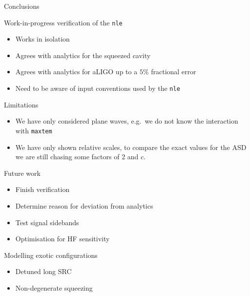 \documentclass[12pt]{beamer}
\newcommand{\code}[1]{\texttt{#1}}
\begin{document}
\begin{frame}{Conclusions}
\begin{block}{Work-in-progress verification of the \code{nle}}
\begin{itemize}
\item Works in isolation 
\item Agrees with analytics for the squeezed cavity
\item Agrees with analytics for aLIGO up to a $5\%$ fractional error
\item Need to be aware of input conventions used by the \code{nle}
\end{itemize}
\end{block}

\begin{alertblock}{Limitations}
\begin{itemize}
\item We have only considered plane waves, e.g.\ we do not know the interaction with \code{maxtem}
\item We have only shown relative scales, to compare the exact values for the ASD we are still chasing some factors of $2$ and $c$.
\end{itemize}
\end{alertblock}
\end{frame}

\begin{frame}{Future work}
\begin{itemize}
\item Finish verification
\item Determine reason for deviation from analytics
\item Test signal sidebands
\item Optimisation for HF sensitivity
\end{itemize}
\begin{block}{Modelling exotic configurations}
\begin{itemize}
\item Detuned long SRC
\item Non-degenerate squeezing
\end{itemize}
\end{block}
\end{frame}


\begin{frame}
\titlepage 
\end{frame}
\end{document}

